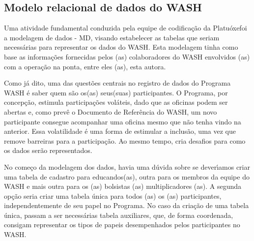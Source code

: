\documentclass[
12pt,		%
openright,	%
twoside,  %
a4paper,			%
chapter=TITLE,		%
english,			%
french,				%
spanish,			%
brazil				%
]{USPSC-classe/USPSC}
\begin{document}
\subsection[Modelo relacional de dados do WASH]{Modelo relacional de dados do WASH}\label{Modelo relacional de dados do WASH}
Uma atividade fundamental conduzida pela equipe de codifica\c{c}\~ao da \textquotedbl Platu\'oxe\textquotedbl  foi a modelagem de dados - MD, visando estabelecer as tabelas que seriam necess\'arias para representar os dados do WASH. Esta modelagem tinha como base as informa\c{c}\~oes fornecidas pelos (as) colaboradores do WASH envolvidos (as) com a opera\c{c}\~ao na ponta, entre eles (as), esta autora.

















Como j\'a dito, uma das quest\~oes centrais no registro de dados do Programa WASH \'e saber quem s\~ao os(as) seus(suas) participantes. O Programa, por concep\c{c}\~ao, estimula participa\c{c}\~oes vol\'ateis, dado que as oficinas podem ser abertas e, como prev\^e o Documento de Refer\^encia do WASH, um novo participante consegue acompanhar uma oficina mesmo que n\~ao tenha vindo na anterior. Essa volatilidade \'e uma forma de estimular a inclus\~ao, uma vez que remove barreiras para a participa\c{c}\~ao. Ao mesmo tempo, cria desafios para como os dados ser\~ao representados.

















No come\c{c}o da modelagem dos dados, havia uma d\'uvida sobre se dever\'{\i}amos criar uma tabela de cadastro para educandos(as), outra para os membros da equipe do WASH e mais outra para os (as) bolsistas (as) multiplicadores (as). A segunda op\c{c}\~ao seria criar uma tabela \'unica para todos (as) os (as) participantes, independentemente de seu papel no Programa. No caso da cria\c{c}\~ao de uma tabela \'unica, passam a ser necess\'arias tabela auxiliares, que, de forma coordenada, consigam representar os \textquotedbl tipos de papeis \textquotedbl   desempenhados pelos participantes no WASH.
\end{document}
